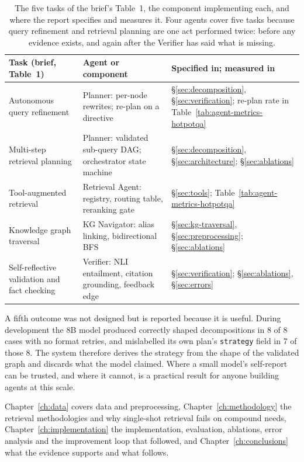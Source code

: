 \begin{table}[htbp]
  \centering
  \small
  \caption{The five tasks of the brief's Table~1, the component implementing
  each, and where the report specifies and measures it. Four agents cover five
  tasks because query refinement and retrieval planning are one act performed
  twice: before any evidence exists, and again after the Verifier has said what
  is missing.}
  \label{tab:task-mapping}
  \begin{tabular}{p{4.0cm}p{4.6cm}p{5.6cm}}
    \toprule
    Task (brief, Table~1) & Agent or component & Specified in; measured in \\
    \midrule
    Autonomous query refinement &
      Planner: per-node rewrites; re-plan on a directive &
      \S\ref{sec:decomposition}, \S\ref{sec:verification};
      re-plan rate in Table~\ref{tab:agent-metrics-hotpotqa} \\
    Multi-step retrieval planning &
      Planner: validated sub-query DAG; orchestrator state machine &
      \S\ref{sec:decomposition}, \S\ref{sec:architecture};
      \S\ref{sec:ablations} \\
    Tool-augmented retrieval &
      Retrieval Agent: registry, routing table, reranking gate &
      \S\ref{sec:tools}; Table~\ref{tab:agent-metrics-hotpotqa} \\
    Knowledge graph traversal &
      KG Navigator: alias linking, bidirectional BFS &
      \S\ref{sec:kg-traversal}, \S\ref{sec:preprocessing};
      \S\ref{sec:ablations} \\
    Self-reflective validation and fact checking &
      Verifier: NLI entailment, citation grounding, feedback edge &
      \S\ref{sec:verification}; \S\ref{sec:ablations}, \S\ref{sec:errors} \\
    \bottomrule
  \end{tabular}
\end{table}

A fifth outcome was not designed but is reported because it is useful. During
development the 8B model produced correctly shaped decompositions in 8 of 8
cases with no format retries, and mislabelled its own plan's
\texttt{strategy} field in 7 of those 8. The system therefore derives the
strategy from the shape of the validated graph and discards what the model
claimed. Where a small model's self-report can be trusted, and where it cannot,
is a practical result for anyone building agents at this scale.

Chapter~\ref{ch:data} covers data and preprocessing, Chapter~\ref{ch:methodology}
the retrieval methodologies and why single-shot retrieval fails on compound
needs, Chapter~\ref{ch:implementation} the implementation, evaluation,
ablations, error analysis and the improvement loop that followed, and
Chapter~\ref{ch:conclusions} what the evidence supports and what follows.
